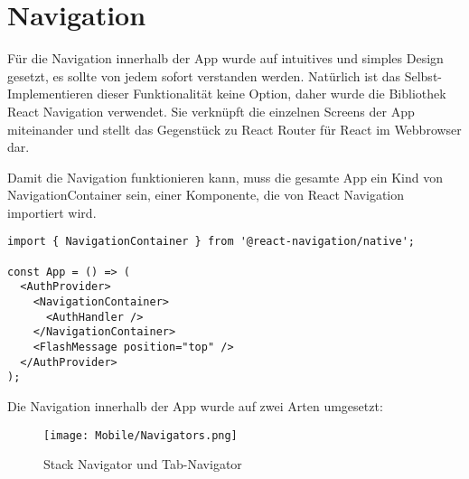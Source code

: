 \chapter{Navigation}
Für die Navigation innerhalb der App wurde auf intuitives und simples Design gesetzt, es sollte von
jedem sofort verstanden werden. Natürlich ist das Selbst-Implementieren dieser Funktionalität keine
Option, daher wurde die Bibliothek React Navigation verwendet. Sie verknüpft die einzelnen Screens
der App miteinander und stellt das Gegenstück zu React Router für React im Webbrowser dar.

Damit die Navigation funktionieren kann, muss die gesamte App ein Kind von NavigationContainer sein,
einer Komponente, die von React Navigation importiert wird.

\begin{lstlisting}
import { NavigationContainer } from '@react-navigation/native';

const App = () => (
  <AuthProvider>
    <NavigationContainer>
      <AuthHandler />
    </NavigationContainer>
    <FlashMessage position="top" />
  </AuthProvider>
);
\end{lstlisting}

Die Navigation innerhalb der App wurde auf zwei Arten umgesetzt:

\begin{figure}[H]
  \begin{center}
    \texttt{[image: Mobile/Navigators.png]}
    \caption{Stack Navigator und Tab-Navigator}
  \end{center}
\end{figure}

\newpage


\newpage

